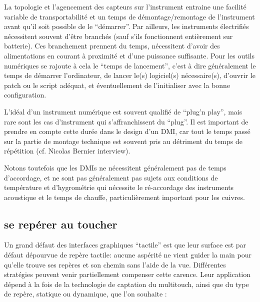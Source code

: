 La topologie et l'agencement des capteurs sur l'instrument entraine une facilité variable de transportabilité et un temps de démontage/remontage de l'instrument avant qu'il soit possible de le ``démarrer''.
Par ailleurs, les instruments électrifiés nécessitent souvent d'être branchés (sauf s'ils fonctionnent entièrement sur batterie). Ces branchement prennent du temps, nécessitent d'avoir des alimentations en courant à proximité et d'une puissance suffisante. Pour les outils numériques se rajoute à cela le ``temps de lancement'', c'est à dire généralement le temps de démarrer l'ordinateur, de lancer le(s) logiciel(s) nécessaire(s), d'ouvrir le patch ou le script adéquat, et éventuellement de l'initialiser avec la bonne configuration.

L'idéal d'un instrument numérique est souvent qualifié de ``plug'n play'', mais rare sont les cas d'instrument qui s'affranchissent du ``plug''. Il est important de prendre en compte cette durée dans le design d'un DMI, car tout le temps passé sur la partie de montage technique est souvent pris au détriment du temps de répétition (cf. Nicolas Bernier interview). 

Notons toutefois que les DMIs ne nécessitent généralement pas de temps d'accordage, et ne sont pas généralement pas sujets aux conditions de température et d'hygrométrie qui nécessite le ré-accordage des instruments acoustique et le temps de chauffe, particulièrement important pour les cuivres.


\subsection{se repérer au toucher}
Un grand défaut des interfaces graphiques ``tactile'' est que leur surface est par défaut dépourvue de repère tactile: aucune aspérité ne vient guider la main pour qu'elle trouve ses repères et son chemin sans l'aide de la vue. Différentes stratégies peuvent venir partiellement compenser cette carence. Leur application dépend à la fois de la technologie de captation du multitouch, ainsi que du type de repère, statique ou dynamique, que l'on souhaite :

